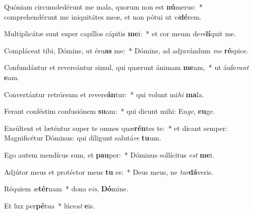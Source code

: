 \item Quóniam circumdedérunt me mala, quorum non est \textbf{nú}merus:~* comprehendérunt me iniquitátes meæ, et non pótui ut \textit{vi}\textbf{dé}rem.

\item Multiplicátæ sunt super capíllos cápitis \textbf{me}i:~* et cor meum de\textit{re}\textbf{lí}quit me.

\item Compláceat tibi, Dómine, ut éru\textbf{as} me:~* Dómine, ad adjuvándum \textit{me} \textbf{ré}spice.

\item Confundántur et revereántur simul, qui quærunt ánimam \textbf{me}am,~* ut áufe\textit{rant} \textbf{e}am.

\item Convertántur retrórsum et revere\textbf{án}tur:~* qui volunt mi\textit{hi} \textbf{ma}la.

\item Ferant conféstim confusiónem \textbf{su}am:~* qui dicunt mihi: Eu\textit{ge}, \textbf{eu}ge.

\item Exsúltent et læténtur super te omnes quæ\textbf{rén}tes te:~* et dicant semper: Magnificétur Dóminus: qui díligunt salutá\textit{re} \textbf{tu}um.

\item Ego autem mendícus sum, et \textbf{pau}per:~* Dóminus sollícitus \textit{est} \textbf{me}i.

\item Adjútor meus et protéctor meus \textbf{tu} es:~* Deus meus, ne \textit{tar}\textbf{dá}veris.

\item Réquiem æ\textbf{tér}nam~* dona e\textit{is}, \textbf{Dó}mine.

\item Et lux per\textbf{pé}tua~* lúce\textit{at} \textbf{e}is.